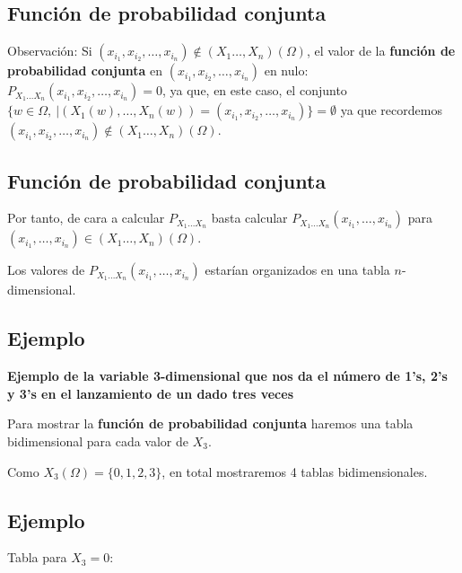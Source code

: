 \documentclass[]{book}
\begin{document}
\hypertarget{funciuxf3n-de-probabilidad-conjunta-3}{%
\subsection{Función de probabilidad conjunta}\label{funciuxf3n-de-probabilidad-conjunta-3}}

Observación:
Si \((x_{i_1},x_{i_2},\ldots,x_{i_n})\not\in (X_1\ldots,X_n)(\Omega)\), el valor de la \textbf{función de probabilidad conjunta} en \((x_{i_1},x_{i_2},\ldots,x_{i_n})\) en nulo: \(P_{X_1\ldots X_n}(x_{i_1},x_{i_2},\ldots,x_{i_n})=0\), ya que, en este caso, el conjunto \(\{w\in\Omega,\ | (X_1(w),\ldots,X_n(w))=(x_{i_1},x_{i_2},\ldots,x_{i_n})\}=\emptyset\) ya que recordemos \((x_{i_1},x_{i_2},\ldots,x_{i_n})\not\in (X_1\ldots,X_n)(\Omega)\).

\hypertarget{funciuxf3n-de-probabilidad-conjunta-4}{%
\subsection{Función de probabilidad conjunta}\label{funciuxf3n-de-probabilidad-conjunta-4}}

Por tanto, de cara a calcular \(P_{X_1\ldots X_n}\) basta calcular \(P_{X_1\ldots X_n}(x_{i_1},\ldots,x_{i_n})\) para \((x_{i_1},\ldots,x_{i_n})\in (X_1\ldots,X_n)(\Omega)\).

Los valores de \(P_{X_1\ldots X_n}(x_{i_1},\ldots,x_{i_n})\) estarían organizados en una tabla \(n\)-dimensional.

\hypertarget{ejemplo-84}{%
\subsection{Ejemplo}\label{ejemplo-84}}

\textbf{Ejemplo de la variable 3-dimensional que nos da el número de 1's, 2's y 3's en el lanzamiento de un dado tres veces}

Para mostrar la \textbf{función de probabilidad conjunta} haremos una tabla bidimensional para cada valor de \(X_3\).

Como \(X_3(\Omega)=\{0,1,2,3\}\), en total mostraremos 4 tablas bidimensionales.

\hypertarget{ejemplo-85}{%
\subsection{Ejemplo}\label{ejemplo-85}}

Tabla para \(X_3=0\):
\end{document}
